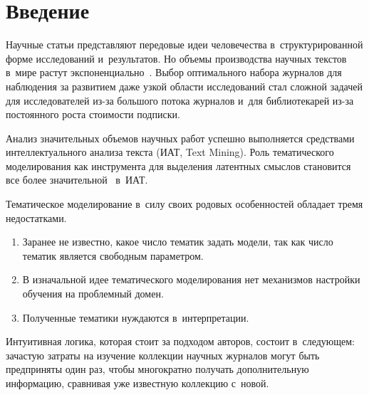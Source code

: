     
 



\thispagestyle{headings}

\begin{multicols}{2}

\label{st\stat}
    
    \section{Введение}
    
    Научные статьи представляют передовые идеи человечества 
    в~структурированной форме исследований и~результатов.
    Но объемы производства научных текстов в~мире растут экспоненциально~\cite{verstak2014shoulders}.
    Выбор оптимального набора журналов для наблюдения за развитием даже узкой 
области исследований стал сложной задачей для исследователей из-за большого 
потока журналов и~для библиотекарей из-за постоянного роста стоимости подписки.
    
    Анализ значительных объемов научных работ успешно выполняется средствами 
интеллектуального анализа текста (ИАТ, Text Mining).
    Роль тематического моделирования как инструмента для выделения латентных 
смыслов становится все более значительной~\cite{jelodar2018latent} в~ИАТ.
    
    Тематическое моделирование в~силу своих родовых особенностей обладает 
тремя недостатками.
        \begin{enumerate}[1.]
               \item Заранее не известно, какое число тематик задать модели, так 
как число тематик является свободным параметром.
        \item В изначальной идее тематического моделирования нет механизмов 
настройки обучения на проблемный домен.
        \item Полученные тематики нуждаются в~интерпретации.
    \end{enumerate}
    
    Интуитивная логика, которая стоит за подходом авторов, состоит 
    в~следующем: зачастую затраты на изучение коллекции научных журналов могут быть 
предприняты один раз, чтобы многократно получать дополнительную информацию, 
сравнивая уже известную коллекцию с~новой.
    

\end{multicols}
